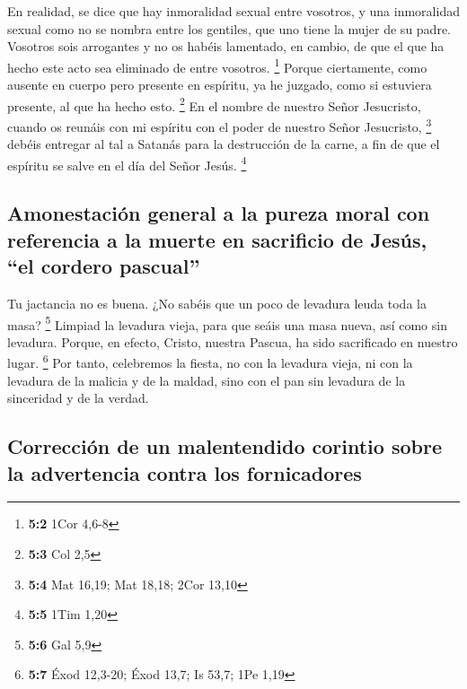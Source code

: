 \begin{paracol}{2}
 En realidad, se dice que hay inmoralidad sexual entre
vosotros, y una inmoralidad sexual como no se nombra entre los gentiles,
que uno tiene la mujer de su padre.  Vosotros sois
arrogantes y no os habéis lamentado, en cambio, de que el que ha hecho
este acto sea eliminado de entre vosotros. \footnote{\textbf{5:2} 1Cor
  4,6-8}  Porque ciertamente, como ausente en cuerpo pero
presente en espíritu, ya he juzgado, como si estuviera presente, al que
ha hecho esto. \footnote{\textbf{5:3} Col 2,5}  En el
nombre de nuestro Señor Jesucristo, cuando os reunáis con mi espíritu
con el poder de nuestro Señor Jesucristo, \footnote{\textbf{5:4} Mat
  16,19; Mat 18,18; 2Cor 13,10}  debéis entregar al tal a
Satanás para la destrucción de la carne, a fin de que el espíritu se
salve en el día del Señor Jesús. \footnote{\textbf{5:5} 1Tim 1,20}

\hypertarget{amonestaciuxf3n-general-a-la-pureza-moral-con-referencia-a-la-muerte-en-sacrificio-de-jesuxfas-el-cordero-pascual}{%
\subsection{Amonestación general a la pureza moral con referencia a la
muerte en sacrificio de Jesús, ``el cordero
pascual''}\label{amonestaciuxf3n-general-a-la-pureza-moral-con-referencia-a-la-muerte-en-sacrificio-de-jesuxfas-el-cordero-pascual}}

 Tu jactancia no es buena. ¿No sabéis que un poco de
levadura leuda toda la masa? \footnote{\textbf{5:6} Gal 5,9}
 Limpiad la levadura vieja, para que seáis una masa nueva,
así como sin levadura. Porque, en efecto, Cristo, nuestra Pascua, ha
sido sacrificado en nuestro lugar. \footnote{\textbf{5:7} Éxod 12,3-20;
  Éxod 13,7; Is 53,7; 1Pe 1,19}  Por tanto, celebremos la
fiesta, no con la levadura vieja, ni con la levadura de la malicia y de
la maldad, sino con el pan sin levadura de la sinceridad y de la verdad.

\hypertarget{correcciuxf3n-de-un-malentendido-corintio-sobre-la-advertencia-contra-los-fornicadores}{%
\subsection{Corrección de un malentendido corintio sobre la advertencia
contra los
fornicadores}\label{correcciuxf3n-de-un-malentendido-corintio-sobre-la-advertencia-contra-los-fornicadores}}


\end{paracol}
